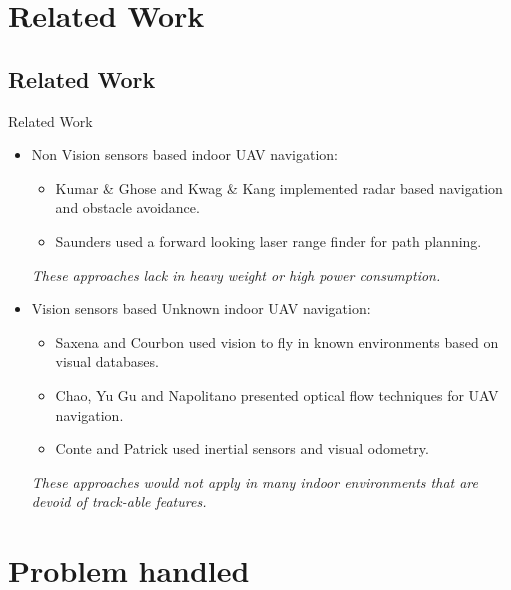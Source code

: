 \documentclass[8pt]{beamer}
\begin{document}
\section{Related Work}

\subsection{Related Work}

\begin{frame}{Related Work}
\begin{itemize}
\setlength\itemsep{2em}
\item {Non Vision sensors based indoor UAV navigation:}
    \begin{itemize}
    \setlength\itemsep{1em}
      \item Kumar \& Ghose and Kwag \& Kang implemented radar based
	    navigation and obstacle avoidance.
      \item Saunders used a forward looking laser range finder for
	    path planning. 
    \end{itemize}
    \bigskip
  \textit{
    \alert{These approaches lack in heavy weight or high power consumption.}}
\item {Vision sensors based Unknown indoor UAV navigation:}
    \begin{itemize}
    \setlength\itemsep{1em}
      \item Saxena and Courbon used vision to fly in known environments based on visual databases.
      \item Chao, Yu Gu and Napolitano presented optical flow techniques for UAV navigation.
      \item Conte and Patrick used inertial sensors and visual odometry.
    \end{itemize}
    \bigskip
  \textit{
    \alert{These approaches would not apply in many indoor environments that are devoid of
track-able features.}}
\end{itemize}
\end{frame}


\section{Problem handled}

\end{document}

